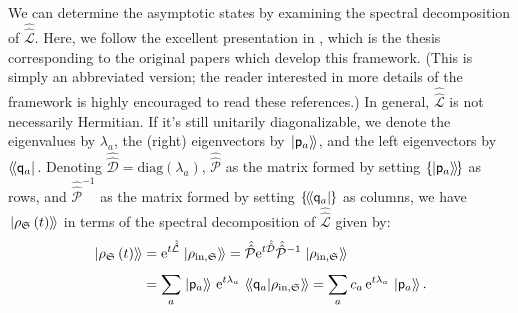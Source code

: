 \documentclass[preprints,article,accept,moreauthors,pdftex]{Definitions/mdpi}
\begin{document}
\begin{paracol}{2}
We can determine the asymptotic states by examining the spectral decomposition of $\hat{\hat{\mathcal{L}}}$. %
Here, we follow the excellent presentation in \cite{Albert18}, which is the thesis corresponding to the original papers \cite{Albert14, ABFJ16} which develop this framework. (This is simply an abbreviated version; the reader interested in more details of the framework is highly encouraged to read these references.) %
In general, $\hat{\hat{\mathcal{L}}}$ is not necessarily Hermitian. If it's still unitarily diagonalizable, we denote the eigenvalues by $\lambda_{a}$, the (right) eigenvectors by $\left.\ket{\mathsf{p}_{a}}\!\right\rangle$, and the left eigenvectors by $\left\langle\!\bra{\mathsf{q}_{a}}\right.$. Denoting $\hat{\hat{\mathcal{D}}} = \mathrm{diag}\left(\lambda_{a}\right)$, $\hat{\hat{\mathcal{P}}}$ as the matrix formed by setting $\left\{\!\left.\ket{\mathsf{p}_{a}}\!\right\rangle\!\right\}$ as rows, and $\hat{\hat{\mathcal{P}}}^{-1}$ as the matrix formed by setting $\left\{\!\left\langle\!\bra{\mathsf{q}_{a}}\right.\!\right\}$ as columns, we have $\left.\ket{\rho_{\mathfrak{S}}\left(t\right)}\!\right\rangle$ in terms of the spectral decomposition of $\hat{\hat{\mathcal{L}}}$ given by:
\begin{equation}
    \label{eq:GKSL-time-evol-spec-decomp-normal}
    \begin{split}
        \left.\ket{\rho_{\mathfrak{S}}\left(t\right)}\!\right\rangle &= \mathrm{e}^{t\hat{\hat{\mathcal{L}}}}\left.\ket{\rho_{\mathrm{in},\mathfrak{S}}}\!\right\rangle = \hat{\hat{\mathcal{P}}}\mathrm{e}^{t\hat{\hat{\mathcal{D}}}}\hat{\hat{\mathcal{P}}}^{-1}\left.\ket{\rho_{\mathrm{in},\mathfrak{S}}}\!\right\rangle \\[4pt]
        &= \sum_{a}\left.\ket{\mathsf{p}_{a}}\!\right\rangle\, \mathrm{e}^{t\lambda_{a}}\,\left\langle\!\Braket{\mathsf{q}_{a}\!|\!\rho_{\mathrm{in},\mathfrak{S}}}\!\right\rangle = \sum_{a} c_{a}\,\mathrm{e}^{t\lambda_{a}}\!\:\left.\ket{\mathsf{p}_{a}}\!\right\rangle.
    \end{split}
\end{equation}

\end{paracol}
\end{document}

